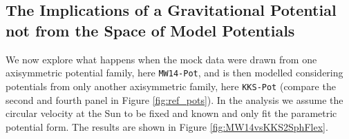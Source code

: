 \subsection{The Implications of a Gravitational Potential not from the Space of Model Potentials} \label{sec:results_potential}


We now explore what happens when the mock data were drawn from one axisymmetric potential family, here \texttt{MW14-Pot}, and is then modelled considering potentials from only another axisymmetric family, here \texttt{KKS-Pot} (compare the second and fourth panel in Figure \ref{fig:ref_pots}). In the analysis we assume the circular velocity at the Sun to be fixed and known  and only fit the parametric potential form. The results are shown in Figure \ref{fig:MW14vsKKS2SphFlex}.





